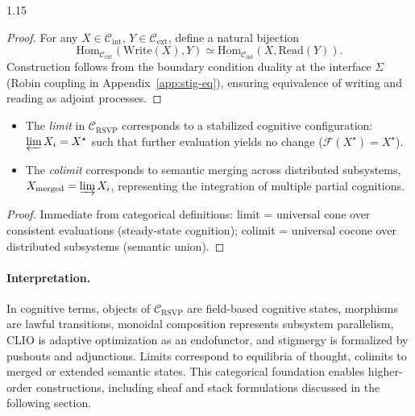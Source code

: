 \documentclass[12pt,a4paper]{article}
\begin{document}
\begin{spacing}{1.15}
\begin{proof}
For any \(X\in\mathcal{C}_{\mathrm{int}}\), \(Y\in\mathcal{C}_{\mathrm{ext}}\),
define a natural bijection
\[
  \mathrm{Hom}_{\mathcal{C}_{\mathrm{ext}}}(\mathrm{Write}(X),Y)
  \simeq
  \mathrm{Hom}_{\mathcal{C}_{\mathrm{int}}}(X,\mathrm{Read}(Y)).
\]
Construction follows from the boundary condition duality
at the interface \(\Sigma\) (Robin coupling in Appendix~\ref{app:stig-eq}),
ensuring equivalence of writing and reading as adjoint processes.
\end{proof}

\begin{proposition}
\label{prop:limits}
\begin{itemize}[nosep]
  \item The \emph{limit} in \(\mathcal{C}_{\mathrm{RSVP}}\) corresponds to a stabilized cognitive configuration:
        \(\varprojlim X_i = X^\star\) such that further evaluation yields no change (\(\mathcal{F}(X^\star)=X^\star\)).
  \item The \emph{colimit} corresponds to semantic merging across distributed subsystems,
        \(X_{\mathrm{merged}} = \varinjlim X_i\),
        representing the integration of multiple partial cognitions.
\end{itemize}
\end{proposition}

\begin{proof}
Immediate from categorical definitions:
limit = universal cone over consistent evaluations (steady-state cognition);
colimit = universal cocone over distributed subsystems (semantic union).
\end{proof}

\paragraph{Interpretation.}
In cognitive terms,
objects of \(\mathcal{C}_{\mathrm{RSVP}}\) are field-based cognitive states,
morphisms are lawful transitions,
monoidal composition represents subsystem parallelism,
CLIO is adaptive optimization as an endofunctor,
and stigmergy is formalized by pushouts and adjunctions.
Limits correspond to equilibria of thought,
colimits to merged or extended semantic states.
This categorical foundation enables higher-order constructions,
including sheaf and stack formulations discussed in the following section.


\end{spacing}
\end{document}
